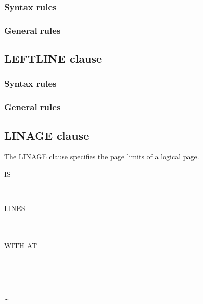 \subsubsection{Syntax rules}

\subsubsection{General rules}

\subsection{LEFTLINE clause}

\begin{syntax}[\miscextcolour]
\end{syntax}

\subsubsection{Syntax rules}

\subsubsection{General rules}

\subsection{LINAGE clause}

The LINAGE clause specifies the page limits of a logical page.

\begin{syntax}
   IS
  \begin{1=}
    \identifier \\
    \literal
  \end{1=}
  LINES
  \begin{0-1}
    \begin{1=}
       \\
       \\
      WITH  AT
    \end{1=}
    \begin{1=}
      \identifier \\
      \literal
    \end{1=} \\
  \end{0-1}
  \ldots \\
\end{syntax}

